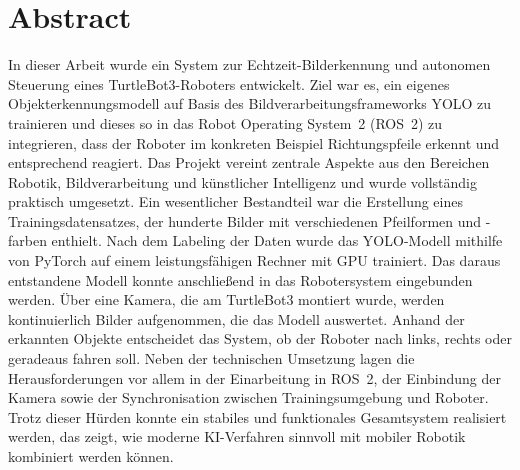 \section*{Abstract}
In dieser Arbeit wurde ein System zur Echtzeit-Bilderkennung und autonomen Steuerung eines TurtleBot3-Roboters entwickelt. 
Ziel war es, ein eigenes Objekterkennungsmodell auf Basis des Bildverarbeitungsframeworks YOLO zu trainieren und dieses so in das Robot Operating System~2 (ROS~2) zu integrieren, 
dass der Roboter im konkreten Beispiel Richtungspfeile erkennt und entsprechend reagiert. 
Das Projekt vereint zentrale Aspekte aus den Bereichen Robotik, Bildverarbeitung und künstlicher Intelligenz und wurde vollständig praktisch umgesetzt.
\newPar
Ein wesentlicher Bestandteil war die Erstellung eines Trainingsdatensatzes, der hunderte Bilder mit verschiedenen Pfeilformen und -farben enthielt. 
Nach dem Labeling der Daten wurde das YOLO-Modell mithilfe von PyTorch auf einem leistungsfähigen Rechner mit GPU trainiert. 
Das daraus entstandene Modell konnte anschließend in das Robotersystem eingebunden werden. 
Über eine Kamera, die am TurtleBot3 montiert wurde, werden kontinuierlich Bilder aufgenommen, die das Modell auswertet. 
Anhand der erkannten Objekte entscheidet das System, ob der Roboter nach links, rechts oder geradeaus fahren soll.
\newPar
Neben der technischen Umsetzung lagen die Herausforderungen vor allem in der Einarbeitung in ROS~2, der Einbindung der Kamera sowie der Synchronisation zwischen Trainingsumgebung und Roboter. 
Trotz dieser Hürden konnte ein stabiles und funktionales Gesamtsystem realisiert werden, das zeigt, wie moderne KI-Verfahren sinnvoll mit mobiler Robotik kombiniert werden können.
